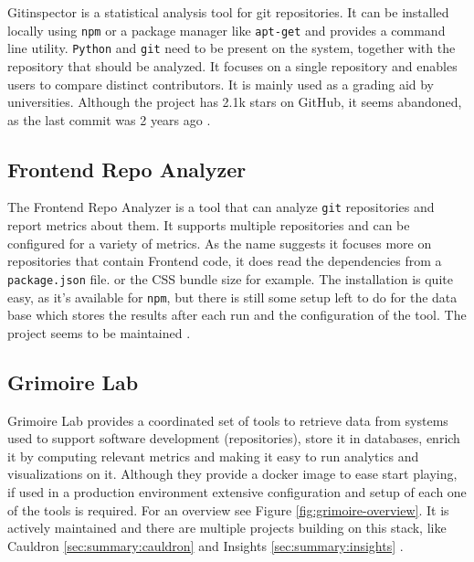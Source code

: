 \documentclass[authoryear,preprint,review,12pt]{elsarticle}
\newcommand{\code}[1]{\colorbox{mygray}{\vphantom{Tg}\lstinline|#1|}}
\begin{document}
Gitinspector is a statistical analysis tool for git repositories. It can be installed locally using
\code{npm} or a package manager like \code{apt-get} and provides a command line utility.
\code{Python} and \code{git} need to be present on the system, together with the repository that
should be analyzed. It focuses on a single repository and enables users to compare distinct
contributors. It is mainly used as a grading aid by universities. Although the project has 2.1k
stars on GitHub, it seems abandoned, as the last commit was 2 years ago
\citep{EjwaGitinspector2022}.

\subsection{Frontend Repo Analyzer}
\label{sec:summary:repoanalyzer}

The Frontend Repo Analyzer is a tool that can analyze \code{git} repositories and report metrics
about them. It supports multiple repositories and can be configured for a variety of metrics. As
the name suggests it focuses more on repositories that contain Frontend code, it does read the
dependencies from a \code{package.json} file. or the CSS bundle size for example. The installation
is quite easy, as it's available for \code{npm}, but there is still some setup left to do for the
data base which stores the results after each run and the configuration of the tool. The project
seems to be maintained \citep{FrontendRepoAnalyzer2022}.

\subsection{Grimoire Lab}
\label{sec:summary:grimoire}

Grimoire Lab provides a coordinated set of tools to retrieve data from systems used to support
software development (repositories), store it in databases, enrich it by computing relevant metrics
and making it easy to run analytics and visualizations on it. Although they provide a docker image
to ease start playing, if used in a production environment extensive configuration and setup of
each one of the tools is required. For an overview see Figure \ref{fig:grimoire-overview}. It is
actively maintained and there are multiple projects building on this stack, like Cauldron
\ref{sec:summary:cauldron} and Insights \ref{sec:summary:insights}
\citep{duenasGrimoireLabToolsetSoftware2021,GrimoireLab2022}.
\end{document}

